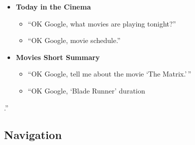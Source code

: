 \documentclass[
  jou,
  floatsintext,
  longtable,
  a4paper,
  nolmodern,
  notxfonts,
  notimes,
  colorlinks=true,linkcolor=blue,citecolor=blue,urlcolor=blue]{apa7}
\providecommand{\tightlist}{%
  \setlength{\itemsep}{0pt}\setlength{\parskip}{0pt}}
\begin{document}
\begin{itemize}
\tightlist
\item
  \textbf{Today in the Cinema}

  \begin{itemize}
  \tightlist
  \item
    ``OK Google, what movies are playing tonight?''
  \item
    ``OK Google, movie schedule.''
  \end{itemize}
\item
  \textbf{Movies Short Summary}

  \begin{itemize}
  \tightlist
  \item
    ``OK Google, tell me about the movie `The Matrix.'\,''
  \item
    ``OK Google, `Blade Runner' duration
  \end{itemize}
\end{itemize}

.''

\subsection{Navigation}\label{navigation}
\end{document}
